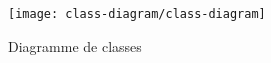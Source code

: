 \begin{figure}[ht]
    \centering
    \caption{Diagramme de classes}
    \texttt{[image: class-diagram/class-diagram]}
    \label{fig:class-diagram}
\end{figure}
\pagebreak